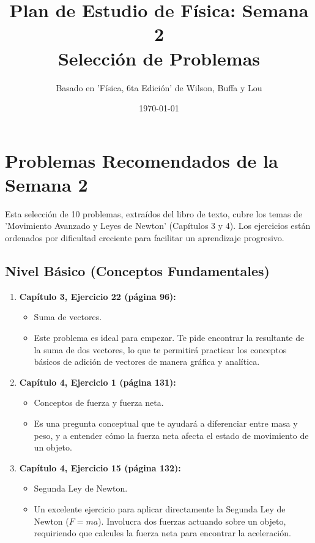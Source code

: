 \documentclass[12pt]{article}
\title{Plan de Estudio de Física: Semana 2 \\ \large Selección de Problemas}
\author{Basado en 'Física, 6ta Edición' de Wilson, Buffa y Lou}
\date{\today}
\begin{document}
\maketitle

\section*{Problemas Recomendados de la Semana 2}

Esta selección de 10 problemas, extraídos del libro de texto, cubre los temas de 'Movimiento Avanzado y Leyes de Newton' (Capítulos 3 y 4). Los ejercicios están ordenados por dificultad creciente para facilitar un aprendizaje progresivo.

\subsection*{Nivel Básico (Conceptos Fundamentales)}

\begin{enumerate}
    \item \textbf{Capítulo 3, Ejercicio 22 (página 96):}
    \begin{itemize}
        \item[\textbf{Tema:}] Suma de vectores.
        \item[\textbf{Descripción:}] Este problema es ideal para empezar. Te pide encontrar la resultante de la suma de dos vectores, lo que te permitirá practicar los conceptos básicos de adición de vectores de manera gráfica y analítica.
    \end{itemize}

    \item \textbf{Capítulo 4, Ejercicio 1 (página 131):}
    \begin{itemize}
        \item[\textbf{Tema:}] Conceptos de fuerza y fuerza neta.
        \item[\textbf{Descripción:}] Es una pregunta conceptual que te ayudará a diferenciar entre masa y peso, y a entender cómo la fuerza neta afecta el estado de movimiento de un objeto.
    \end{itemize}

    \item \textbf{Capítulo 4, Ejercicio 15 (página 132):}
    \begin{itemize}
        \item[\textbf{Tema:}] Segunda Ley de Newton.
        \item[\textbf{Descripción:}] Un excelente ejercicio para aplicar directamente la Segunda Ley de Newton ($F=ma$). Involucra dos fuerzas actuando sobre un objeto, requiriendo que calcules la fuerza neta para encontrar la aceleración.
    \end{itemize}
\end{enumerate}
\end{document}
